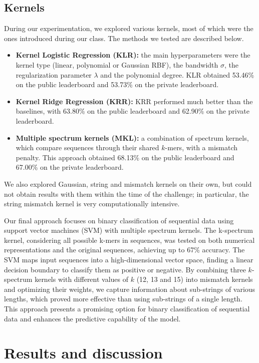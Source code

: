\documentclass[times,5p, twocolumn]{elsarticle}
\begin{document}
\subsection{Kernels}
During our experimentation, we explored various kernels, most of which were the ones introduced during our class. The methods we tested are described below.
\begin{itemize}
    \item \textbf{Kernel Logistic Regression (KLR):} the main hyperparameters were the kernel type (linear, polynomial or Gaussian RBF), the bandwidth $\sigma$, the regularization parameter $\lambda$ and the polynomial degree. KLR obtained 53.46\% on the public leaderboard and 53.73\% on the private leaderboard.
    \item \textbf{Kernel Ridge Regression (KRR):} KRR performed much better than the baselines, with 63.80\% on the public leaderboard and 62.90\% on the private leaderboard.
    \item \textbf{Multiple spectrum kernels (MKL):} a combination of spectrum kernels, which compare sequences through their shared $k$-mers, with a mismatch penalty. This approach obtained 68.13\% on the public leaderboard and 67.00\% on the private leaderboard.
\end{itemize}
We also explored Gaussian, string and mismatch kernels on their own, but could not obtain results with them within the time of the challenge; in particular, the string mismatch kernel is very computationally intensive.

Our final approach focuses on binary classification of sequential data using support vector machines (SVM) with multiple spectrum kernels. The k-spectrum kernel, considering all possible k-mers in sequences, was tested on both numerical representations and the original sequences, achieving up to 67\% accuracy. The SVM maps input sequences into a high-dimensional vector space, finding a linear decision boundary to classify them as positive or negative. By combining three $k$-spectrum kernels with different values of $k$ (12, 13 and 15) into mismatch kernels and optimizing their weights, we capture information about sub-strings of various lengths, which proved more effective than using sub-strings of a single length. This approach presents a promising option for binary classification of sequential data and enhances the predictive capability of the model.


\section{Results and discussion}
\end{document}
